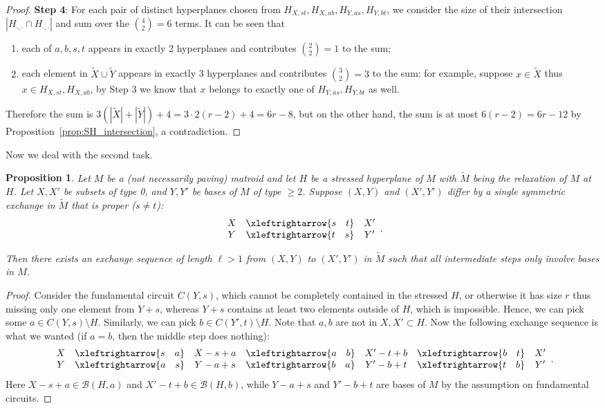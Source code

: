 \documentclass{amsart}
\newtheorem{proposition}[theorem]{Proposition}
\newcommand{\swap}[2]{\xleftrightarrow{#1 \quad #2}}
\newcommand\Bcal{{\mathcal B}}
\begin{document}
\begin{proof}
    {\bf Step 4}: For each pair of distinct hyperplanes chosen from $H_{X,st}, H_{X,ab}, H_{Y,as}, H_{Y,bt}$, we consider the size of their intersection $|H_{\cdot,\cdot}\cap H_{\cdot,\cdot}|$ and sum over the $\binom{4}{2}=6$ terms. It can be seen that
    \begin{enumerate}
        \item each of $a,b,s,t$ appears in exactly 2 hyperplanes and contributes $\binom{2}{2}=1$ to the sum;
        \item each element in $\widetilde{X}\cup\widetilde{Y}$ appears in exactly 3 hyperplanes and contributes $\binom{3}{2}=3$ to the sum: for example, suppose $x\in\widetilde{X}$ thus $x\in H_{X,st}, H_{X,ab}$, by Step 3 we know that $x$ belongs to exactly one of $ H_{Y,as}, H_{Y,bt}$ as well.
    \end{enumerate}
    Therefore the sum is $3(|\widetilde{X}|+|\widetilde{Y}|)+4=3\cdot 2(r-2)+4=6r-8$, but on the other hand, the sum is at most $6(r-2)=6r-12$ by Proposition~\ref{prop:SH_intersection}, a contradiction.
\end{proof}

Now we deal with the second task.

\begin{proposition} \label{prop:XB_XB}
    Let $M$ be a (not necessarily paving) matroid and let $H$ be a stressed hyperplane of $M$ with $\widetilde{M}$ being the relaxation of $M$ at $H$.  
    Let $X,X'$ be subsets of type 0, and $Y,Y'$ be bases of $M$ of type $\geq 2$.  
    Suppose $(X,Y)$ and $(X',Y')$ differ by a single symmetric exchange in $\widetilde{M}$ that is proper ($s\neq t$):
$$
\begin{array}{c c c}
   X   & \swap{s}{t} & X'\\
   Y   & \swap{t}{s} & Y'
\end{array}.
$$

Then there exists an exchange sequence of length $\ell>1$ from $(X,Y)$ to $(X',Y')$ in $\widetilde{M}$ such that all intermediate steps only involve bases in $M$.
\end{proposition}

\begin{proof}
    Consider the fundamental circuit $C(Y,s)$, which cannot be completely contained in the stressed $H$, or otherwise it has size $r$ thus missing only one element from $Y+s$, whereas $Y+s$ contains at least two elements outside of $H$, which is impossible. 
    Hence, we can pick some $a\in C(Y,s)\setminus H$.  
    Similarly, we can pick $b\in C(Y',t)\setminus H$.  
    Note that $a,b$ are not in $X,X'\subset H$.  
    Now the following exchange sequence is what we wanted (if $a=b$, then the middle step does nothing):
    $$
    \begin{array}{c c c c c c c}
        X   & \swap{s}{a} & X-s+a & \swap{a}{b} & X'-t+b & \swap{b}{t} & X'\\
        Y   & \swap{a}{s} & Y-a+s & \swap{b}{a} & Y'-b+t & \swap{t}{b} & Y'
    \end{array}.
    $$
Here $X-s+a\in\Bcal(H,a)$ and $X'-t+b\in\Bcal(H,b)$, while $Y-a+s$ and $Y'-b+t$ are bases of $M$ by the assumption on fundamental circuits.
\end{proof}
\end{document}
